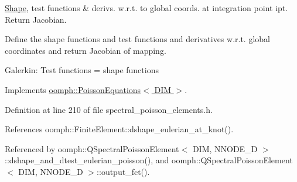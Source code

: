 \hyperlink{classoomph_1_1Shape}{Shape}, test functions \& derivs. w.\+r.\+t. to global coords. at integration point ipt. Return Jacobian. 

Define the shape functions and test functions and derivatives w.\+r.\+t. global coordinates and return Jacobian of mapping.

Galerkin\+: Test functions = shape functions 

Implements \hyperlink{classoomph_1_1PoissonEquations_af68ad067d9a9d1bcbcc1ee3094b77a7a}{oomph\+::\+Poisson\+Equations$<$ D\+I\+M $>$}.



Definition at line 210 of file spectral\+\_\+poisson\+\_\+elements.\+h.



References oomph\+::\+Finite\+Element\+::dshape\+\_\+eulerian\+\_\+at\+\_\+knot().



Referenced by oomph\+::\+Q\+Spectral\+Poisson\+Element$<$ D\+I\+M, N\+N\+O\+D\+E\+\_\+D $>$\+::dshape\+\_\+and\+\_\+dtest\+\_\+eulerian\+\_\+poisson(), and oomph\+::\+Q\+Spectral\+Poisson\+Element$<$ D\+I\+M, N\+N\+O\+D\+E\+\_\+D $>$\+::output\+\_\+fct().

\mbox{\label{classoomph_1_1QSpectralPoissonElement_a20e5c72a2d391708edb7dd2e53666810}} 
